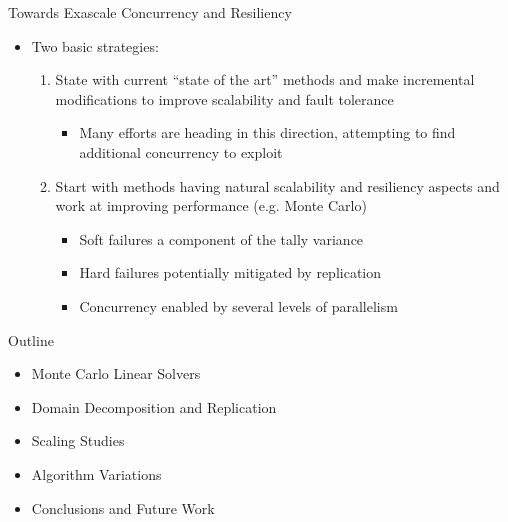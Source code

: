 \documentclass{beamer}
\begin{document}
\begin{frame}{Towards Exascale Concurrency and Resiliency}
  \begin{itemize}
    \item Two basic strategies:
      \vfill
      \begin{enumerate}
        \item State with current ``state of the art'' methods and make
          incremental modifications to improve scalability and fault
          tolerance
          \begin{itemize}
            \item Many efforts are heading in this direction, attempting
              to find additional concurrency to exploit
          \end{itemize}
        \vfill
        \item Start with methods having natural scalability and resiliency
          aspects and work at improving performance (e.g. Monte Carlo)
          \begin{itemize}
            \item Soft failures a component of the tally variance
            \item Hard failures potentially mitigated by replication
            \item Concurrency enabled by several levels of parallelism
          \end{itemize}
      \end{enumerate}
  \end{itemize}
  \vfill
\end{frame}

\begin{frame}{Outline}

  \begin{itemize}
  \item Monte Carlo Linear Solvers
    \vfill
  \item Domain Decomposition and Replication
    \vfill
  \item Scaling Studies
    \vfill
  \item Algorithm Variations
    \vfill
  \item Conclusions and Future Work
  \end{itemize}
  
\end{frame}
\end{document}
